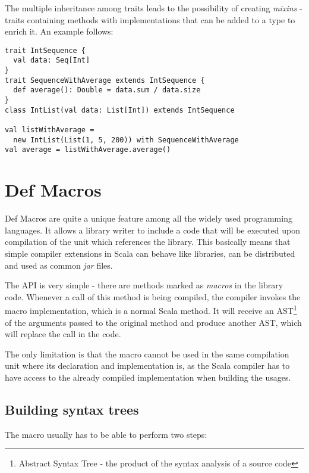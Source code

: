 The multiple inheritance among traits leads to the possibility of creating \textit{mixins} - traits containing methods with implementations that can be added to a type to enrich it. An example follows:

\lstset{style=Scala}
\begin{lstlisting}
trait IntSequence {
  val data: Seq[Int]
}
trait SequenceWithAverage extends IntSequence {
  def average(): Double = data.sum / data.size
}
class IntList(val data: List[Int]) extends IntSequence

val listWithAverage = 
  new IntList(List(1, 5, 200)) with SequenceWithAverage
val average = listWithAverage.average()
\end{lstlisting}

\section{Def Macros}
\label{sec:defmacros}

Def Macros are quite a unique feature among all the widely used programming languages. It allows a library writer to include a code that will be executed upon compilation of the unit which references the library. This basically means that simple compiler extensions in Scala can behave like libraries, can be distributed and used as common \textit{jar} files.

The API is very simple - there are methods marked as \textit{macros} in the library code. Whenever a call of this method is being compiled, the compiler invokes the macro implementation, which is a normal Scala method. It will receive an AST\footnote{Abstract Syntax Tree - the product of the syntax analysis of a source code} of the arguments passed to the original method and produce another AST, which will replace the call in the code.


The only limitation is that the macro cannot be used in the same compilation unit where its declaration and implementation is, as the Scala compiler has to have access to the already compiled implementation when building the usages.

\subsection{Building syntax trees}
\label{subsec:buildingast}

The macro usually has to be able to perform two steps:

